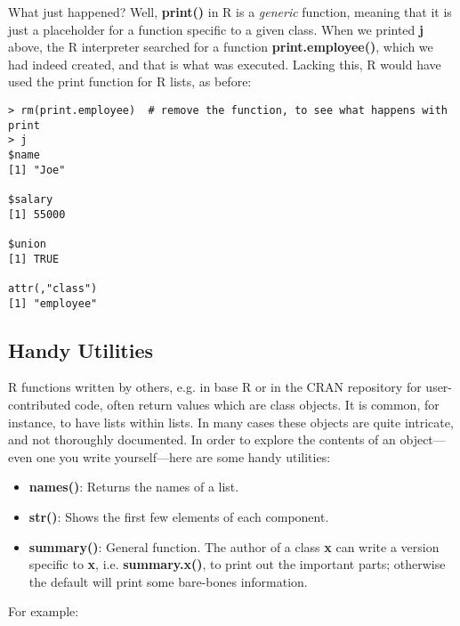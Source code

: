 What just happened?  Well, {\bf print()} in R is a {\it generic}
function, meaning that it is just a placeholder for a function specific
to a given class.  When we printed {\bf j} above, the R interpreter
searched for a function {\bf print.employee()}, which we had indeed
created, and that is what was executed.  Lacking this, R would have used
the print function for R lists, as before:

\begin{lstlisting}
> rm(print.employee)  # remove the function, to see what happens with print
> j
$name
[1] "Joe"

$salary
[1] 55000

$union
[1] TRUE

attr(,"class")
[1] "employee"
\end{lstlisting}

\subsection{Handy Utilities}

R functions written by others, e.g. in base R or in the CRAN repository
for user-contributed code, often return values which are class objects.
It is common, for instance, to have lists within lists.  In many cases
these objects are quite intricate, and not thoroughly documented.  In
order to explore the contents of an object---even one you write
yourself---here are some handy utilities:

\begin{itemize}

\item {\bf names()}:  Returns the names of a list.

\item {\bf str()}:  Shows the first few elements of each component.

\item {\bf summary()}:  General function.  The author of a class {\bf
x} can write a version specific to {\bf x}, i.e. {\bf summary.x()}, to
print out the important parts; otherwise the default will print some
bare-bones information.

\end{itemize}

For example:

